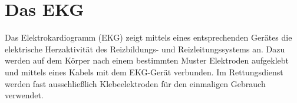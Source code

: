 % 
% 
% 
% 
% 
% 
% 
% 
\section{Das EKG}

Das Elektrokardiogramm (EKG) zeigt mittels eines entsprechenden
Gerätes die elektrische Herzaktivität des
Reizbildungs- und Reizleitungssystems an. Dazu werden auf
dem K\"orper nach einem bestimmten Muster Elektroden
aufgeklebt und mittels eines Kabels mit dem EKG-Gerät
verbunden. Im Rettungsdienst werden fast ausschließlich
Klebeelektroden für den einmaligen Gebrauch verwendet. 

 

